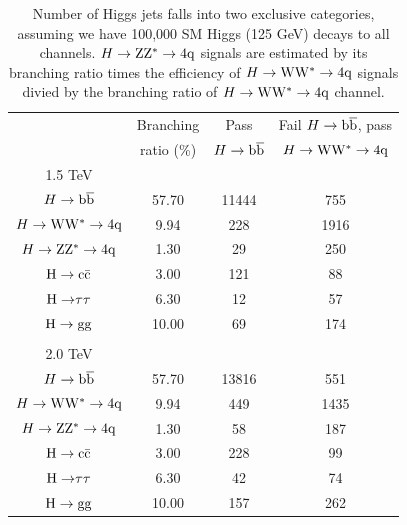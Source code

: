 \begin{table}[htbp]
\begin{center}
\caption{Number of Higgs jets falls into two exclusive categories, assuming we have 100,000 SM Higgs (125 GeV) decays to all channels.
$H\to{\rm Z}{\rm Z}^*\to4{\rm q}$ signals are estimated by its branching ratio times the efficiency of $H\to{\rm W}{\rm W}^*\to4{\rm q}$ signals divied by the branching ratio of $H\to{\rm W}{\rm W}^*\to4{\rm q}$ channel. }
\begin{tabular}{cccc}
\hline
& Branching  & Pass       & Fail $H\to\mathrm{b\overline{b}}$, pass \\
& ratio (\%) & $H\to\mathrm{b\overline{b}}$  &   $H\to{\rm W}{\rm W}^*\to4{\rm q}$ \\ 
\hline
1.5 TeV  & & & \\
$H\to\mathrm{b\overline{b}}$ & 57.70 & 11444 &  755 \\ %
$H\to{\rm W}{\rm W}^*\to4{\rm q}$ & 9.94 & 228 & 1916 \\ %
$H\to{\rm Z}{\rm Z}^*\to4{\rm q}$ & 1.30 & 29 & 250 \\ %
${\rm H\to c\bar{c}}$ & 3.00 & 121 & 88 \\ %
${\rm H\to} \tau \tau$ & 6.30 & 12  & 57 \\ %
${\rm H\to gg}$ & 10.00 & 69 & 174 \\ %
\hline
\\
2.0 TeV &  & & \\ %
$H\to\mathrm{b\overline{b}}$ & 57.70 & 13816 & 551 \\ %
$H\to{\rm W}{\rm W}^*\to4{\rm q}$ & 9.94 & 449 & 1435 \\ %
$H\to{\rm Z}{\rm Z}^*\to4{\rm q}$ & 1.30 & 58 & 187 \\ %
${\rm H\to c\bar{c}}$ & 3.00 & 228 & 99 \\ %
${\rm H\to} \tau \tau$ & 6.30 & 42 & 74 \\ %
${\rm H\to gg}$ & 10.00 & 157  & 262 \\ \hline
\end{tabular}
\label{table:HbbHww}
\end{center}
\end{table}






